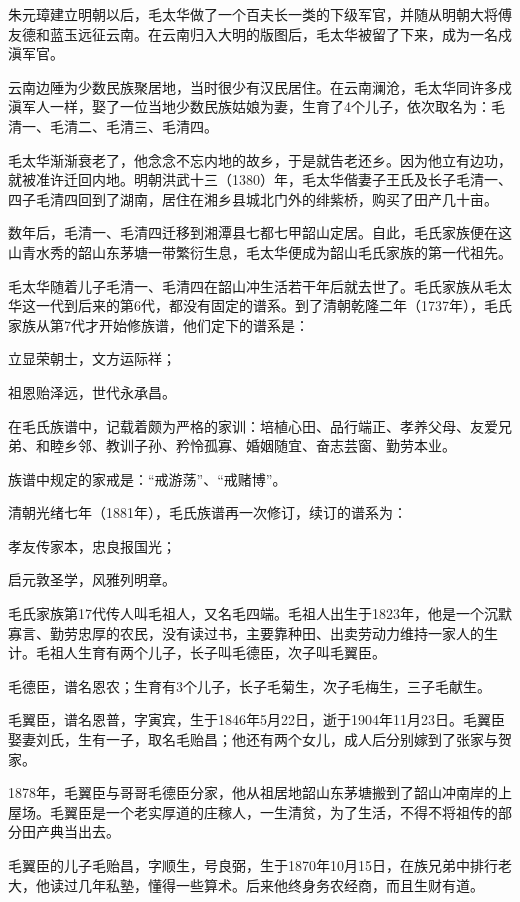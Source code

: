 \documentclass[../../dazhuan.tex]{subfiles}
\begin{document}
朱元璋建立明朝以后，毛太华做了一个百夫长一类的下级军官，并随从明朝大将傅友德和蓝玉远征云南。在云南归入大明的版图后，毛太华被留了下来，成为一名戍滇军官。

云南边陲为少数民族聚居地，当时很少有汉民居住。在云南澜沧，毛太华同许多戍滇军人一样，娶了一位当地少数民族姑娘为妻，生育了4个儿子，依次取名为：毛清一、毛清二、毛清三、毛清四。

毛太华渐渐衰老了，他念念不忘内地的故乡，于是就告老还乡。因为他立有边功，就被准许迁回内地。明朝洪武十三（1380）年，毛太华偕妻子王氏及长子毛清一、四子毛清四回到了湖南，居住在湘乡县城北门外的绯紫桥，购买了田产几十亩。

数年后，毛清一、毛清四迁移到湘潭县七都七甲韶山定居。自此，毛氏家族便在这山青水秀的韶山东茅塘一带繁衍生息，毛太华便成为韶山毛氏家族的第一代祖先。

毛太华随着儿子毛清一、毛清四在韶山冲生活若干年后就去世了。毛氏家族从毛太华这一代到后来的第6代，都没有固定的谱系。到了清朝乾隆二年（1737年），毛氏家族从第7代才开始修族谱，他们定下的谱系是：

立显荣朝士，文方运际祥；

祖恩贻泽远，世代永承昌。

在毛氏族谱中，记载着颇为严格的家训：培植心田、品行端正、孝养父母、友爱兄弟、和睦乡邻、教训子孙、矜怜孤寡、婚姻随宜、奋志芸窗、勤劳本业。

族谱中规定的家戒是：“戒游荡”、“戒赌博”。

清朝光绪七年（1881年），毛氏族谱再一次修订，续订的谱系为：

孝友传家本，忠良报国光；

启元敦圣学，风雅列明章。

毛氏家族第17代传人叫毛祖人，又名毛四端。毛祖人出生于1823年，他是一个沉默寡言、勤劳忠厚的农民，没有读过书，主要靠种田、出卖劳动力维持一家人的生计。毛祖人生育有两个儿子，长子叫毛德臣，次子叫毛翼臣。

毛德臣，谱名恩农；生育有3个儿子，长子毛菊生，次子毛梅生，三子毛献生。

毛翼臣，谱名恩普，字寅宾，生于1846年5月22日，逝于1904年11月23日。毛翼臣娶妻刘氏，生有一子，取名毛贻昌；他还有两个女儿，成人后分别嫁到了张家与贺家。

1878年，毛翼臣与哥哥毛德臣分家，他从祖居地韶山东茅塘搬到了韶山冲南岸的上屋场。毛翼臣是一个老实厚道的庄稼人，一生清贫，为了生活，不得不将祖传的部分田产典当出去。

毛翼臣的儿子毛贻昌，字顺生，号良弼，生于1870年10月15日，在族兄弟中排行老大，他读过几年私塾，懂得一些算术。后来他终身务农经商，而且生财有道。
\end{document}
